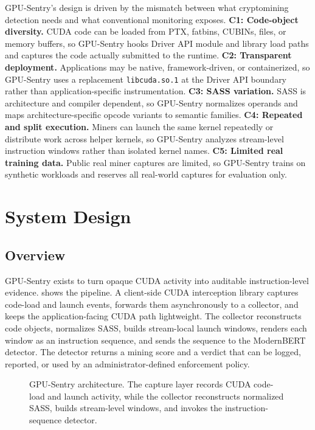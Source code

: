 GPU-Sentry's design is driven by the mismatch between what cryptomining detection needs and what conventional monitoring exposes. \textbf{C1: Code-object diversity.} CUDA code can be loaded from PTX, fatbins, CUBINs, files, or memory buffers, so GPU-Sentry hooks Driver API module and library load paths and captures the code actually submitted to the runtime. \textbf{C2: Transparent deployment.} Applications may be native, framework-driven, or containerized, so GPU-Sentry uses a replacement \texttt{libcuda.so.1} at the Driver API boundary rather than application-specific instrumentation. \textbf{C3: SASS variation.} SASS is architecture and compiler dependent, so GPU-Sentry normalizes operands and maps architecture-specific opcode variants to semantic families. \textbf{C4: Repeated and split execution.} Miners can launch the same kernel repeatedly or distribute work across helper kernels, so GPU-Sentry analyzes stream-level instruction windows rather than isolated kernel names. \textbf{C5: Limited real training data.} Public real miner captures are limited, so GPU-Sentry trains on synthetic workloads and reserves all real-world captures for evaluation only.

\section{System Design}
\label{sec:design}

\subsection{Overview}
\label{sec:design_overview}

GPU-Sentry exists to turn opaque CUDA activity into auditable instruction-level evidence.  shows the pipeline. A client-side CUDA interception library captures code-load and launch events, forwards them asynchronously to a collector, and keeps the application-facing CUDA path lightweight. The collector reconstructs code objects, normalizes SASS, builds stream-local launch windows, renders each window as an instruction sequence, and sends the sequence to the ModernBERT detector. The detector returns a mining score and a verdict that can be logged, reported, or used by an administrator-defined enforcement policy.

\begin{figure}[t]
    \centering
    
    \caption{GPU-Sentry architecture. The capture layer records CUDA code-load and launch activity, while the collector reconstructs normalized SASS, builds stream-level windows, and invokes the instruction-sequence detector.}
    \label{fig:architecture}
\end{figure}

